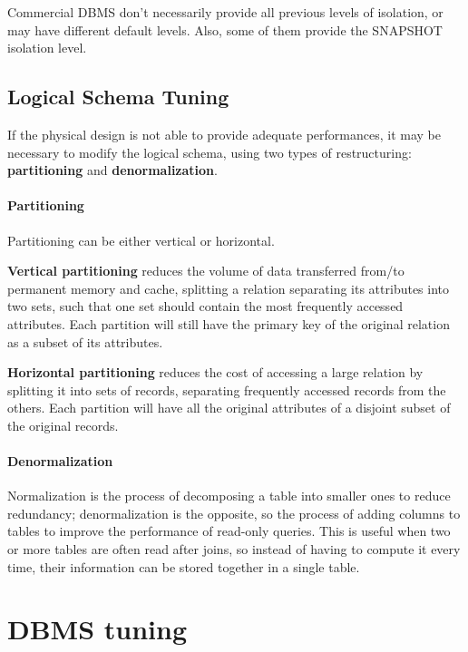Commercial DBMS don't necessarily provide all previous levels of isolation, or may have different default levels. Also, some of them provide the SNAPSHOT isolation level.

\subsection{Logical Schema Tuning}

If the physical design is not able to provide adequate performances, it may be necessary to modify the logical schema, using two types of restructuring: \textbf{partitioning} and \textbf{denormalization}.

\paragraph{Partitioning}

Partitioning can be either vertical or horizontal.

\textbf{Vertical partitioning} reduces the volume of data transferred from/to permanent memory and cache, splitting a relation separating its attributes into two sets, such that one set should contain the most frequently accessed attributes. Each partition will still have the primary key of the original relation as a subset of its attributes.

\textbf{Horizontal partitioning} reduces the cost of accessing a large relation by splitting it into sets of records, separating frequently accessed records from the others. Each partition will have all the original attributes of a disjoint subset of the original records.

\paragraph{Denormalization}

Normalization is the process of decomposing a table into smaller ones to reduce redundancy; denormalization is the opposite, so the process of adding columns to tables to improve the performance of read-only queries. This is useful when two or more tables are often read after joins, so instead of having to compute it every time, their information can be stored together in a single table.

\section{DBMS tuning}

